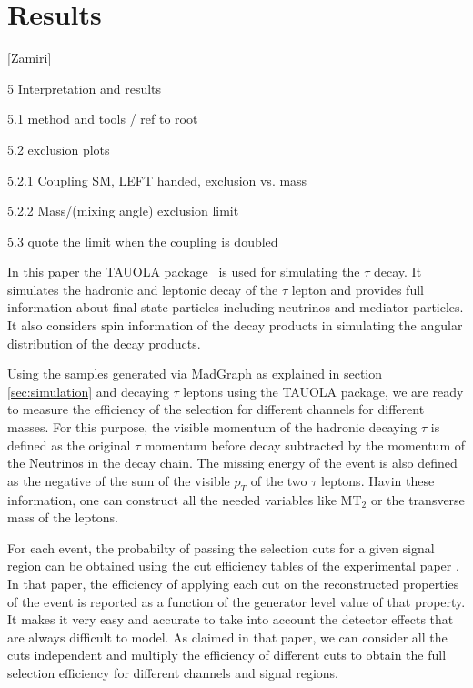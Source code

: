 \section{Results}\label{sec:results} 

[Zamiri]

5 Interpretation and results

5.1 method and tools / ref to root

5.2 exclusion plots

5.2.1 Coupling SM, LEFT handed, exclusion vs. mass

5.2.2 Mass/(mixing angle) exclusion limit

5.3 quote the limit when the coupling is doubled



In this paper the TAUOLA package~\cite{Davidson:2010rw,Jadach:1990mz,Golonka:2003xt,Jadach:1993hs} is used for simulating the $\tau$ decay. It simulates the hadronic and leptonic decay of the $\tau$ lepton and provides full information about final state particles including neutrinos and mediator particles. It also considers spin information of the decay products in simulating the angular distribution of the decay products.

Using the \wprime samples generated via MadGraph as explained in section \ref{sec:simulation} and decaying $\tau$ leptons using the TAUOLA package, we are ready to measure the efficiency of the selection for different channels for different \wprime masses. For this purpose, the visible momentum of the hadronic decaying $\tau$ is defined as the original $\tau$ momentum before decay subtracted by the momentum of the Neutrinos in the decay chain. The missing energy of the event is also defined as the negative of the sum of the visible $p_{T}$ of the two $\tau$ leptons. Havin these information, one can construct all the needed variables like MT$_2$ or the transverse mass of the leptons. 

For each event, the probabilty of passing the selection cuts for a given signal region can be obtained using the cut efficiency tables of the experimental paper \cite{Khachatryan:2016trj}. In that paper, the efficiency of applying each cut on the reconstructed properties of the event is reported as a function of the generator level value of that property. It makes it very easy and accurate to take into account the detector effects that are always difficult to model. As claimed in that paper, we can consider all the cuts independent and multiply the efficiency of different cuts to obtain the full selection efficiency for different channels and signal regions.

